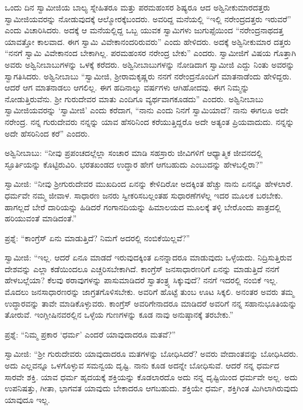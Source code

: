  ಒಂದು ದಿನ ಸ್ವಾಮೀಜಿಯ ಬಾಲ್ಯ ಸ್ನೇಹಿತರೂ ಮತ್ತು ಪರಮಹಂಸರ ಶಿಷ್ಯರೂ ಆದ ಅಶ್ವಿನೀಕುಮಾರದತ್ತರು ಸ್ವಾಮೀಜಿಯವರನ್ನು ನೋಡುವುದಕ್ಕೆ ಆಲ್ಮೋರಕ್ಕೆ\break ಬಂದರು. ಅವರಿದ್ದ ಮನೆಯಲ್ಲಿ “ಇಲ್ಲಿ ನರೇಂದ್ರದತ್ತರು ಇರುವರೆ” ಎಂದು ವಿಚಾರಿಸಿದರು. ಅದಕ್ಕೆ ಆ ಮನೆಯಲ್ಲಿದ್ದ ಒಬ್ಬ ಯುವಕ ಸ್ವಾಮಿಗಳು ಜುಗುಪ್ಸೆಯಿಂದ “ನರೇಂದ್ರನಾಥದತ್ತ ಯಾವತ್ತೋ ಕಾಲವಾದ. ಈಗ ಸ್ವಾಮಿ ವಿವೇಕಾನಂದರಿರುವರು” ಎಂದು ಹೇಳಿದರು. ಅದಕ್ಕೆ ಅಶ್ವಿನೀಕುಮಾರ ದತ್ತರು “ನನಗೆ ಸ್ವಾಮಿ ವಿವೇಕಾನಂದ ಬೇಕಾಗಿಲ್ಲ. ಪರಮಹಂಸರ ನರೇಂದ್ರ ಬೇಕು” ಎಂದರು. ಸ್ವಾಮೀಜಿಗೆ ವಿಷಯ ಗೊತ್ತಾಗಿ ಅವರು ಅಶ್ವಿನೀಬಾಬುಗಳನ್ನು ಒಳಕ್ಕೆ ಕರೆದರು. ಅಶ್ವಿನೀಬಾಬುಗಳನ್ನು ನೋಡಿದಾಗ ಸ್ವಾಮೀಜಿ ಎದ್ದು ನಿಂತು ಅವರನ್ನು ಸ್ವಾಗತಿಸಿದರು. ಅಶ್ವಿನೀಬಾಬು “ಸ್ವಾಮೀಜಿ, ಶ‍್ರೀರಾಮಕೃಷ್ಣರು ನನಗೆ ನರೇಂದ್ರನೊಂದಿಗೆ ಮಾತನಾಡೆಂದು ಹೇಳಿದ್ದರು. ಆದರೆ ಆಗ ಮಾತನಾಡಲು ಆಗಲಿಲ್ಲ. ಈಗ ಹದಿನಾಲ್ಕು ವರ್ಷಗಳು ಆಗಿಹೋದವು. ಈಗ ನಿಮ್ಮನ್ನು ನೋಡುತ್ತಿರುವೆನು. ಶ‍್ರೀ ಗುರುದೇವರ ಮಾತು ಎಂದಿಗೂ ವ್ಯರ್ಥವಾಗಕೂಡದು” ಎಂದರು. ಅಶ್ವಿನೀಬಾಬು ಸ್ವಾಮೀಜಿಯವರನ್ನು ‘ಸ್ವಾಮೀಜಿ’ ಎಂದು ಕರೆದಾಗ, “ನಾನು ಎಂದು ನಿನಗೆ ಸ್ವಾಮಿಯಾದೆ? ನಾನು ಈಗಲೂ ಅದೇ ನರೇಂದ್ರ. ನನ್ನ ಗುರುದೇವರು ನನ್ನನ್ನು ಯಾವ ಹೆಸರಿನಿಂದ ಕರೆಯುತ್ತಿದ್ದರೊ ಅದೇ ಅತ್ಯಂತ ಪ್ರಿಯವಾದುದು. ನನ್ನನ್ನು ಅದೇ ಹೆಸರಿನಿಂದ ಕರೆ” ಎಂದರು. 

 ಅಶ್ವಿನೀಬಾಬು: “ನೀವು ಪ್ರಪಂಚದಲ್ಲೆಲ್ಲಾ ಸಂಚಾರ ಮಾಡಿ ಸಹಸ್ರಾರು ಜೀವಿಗಳಿಗೆ ಆಧ್ಯಾತ್ಮಿಕ ಜೀವನದಲ್ಲಿ ಸ್ಫೂರ್ತಿಯನ್ನು ಕೊಟ್ಟಿರುವಿರಿ. ಭರತಖಂಡದ ಉದ್ಧಾರ ಹೇಗೆ ಆಗಬಹುದು ಎಂಬುದನ್ನು ಹೇಳಬಲ್ಲಿರಾ?” 

 ಸ್ವಾಮೀಜಿ: “ನೀವು ಶ‍್ರೀಗುರುದೇವರ ಮುಖದಿಂದ ಏನನ್ನು ಕೇಳಿದಿರೋ ಅದಕ್ಕಿಂತ ಹೆಚ್ಚು ನಾನು ಏನನ್ನೂ ಹೇಳಲಾರೆ. ಧರ್ಮವೇ ನಮ್ಮ ಜೀವಾಳ. ಸಾಧಾರಣ ಜನರು ಸ್ವೀಕರಿಸಬಲ್ಲಂತಹ ಸುಧಾರಣೆಗಳೆಲ್ಲ ಇದರ ಮೂಲಕ ಬರಬೇಕು. ಹಾಗಲ್ಲದೆ ಬೇರೆ ದಾರಿಯನ್ನು ಹಿಡಿದರೆ ಗಂಗಾನದಿಯನ್ನು ಹಿಮಾಲಯದ ಮೂಲಕ್ಕೆ ತಳ್ಳಿ ಬೇರೊಂದು ಪಾತ್ರದಲ್ಲಿ ಹರಿಯುವಂತೆ ಮಾಡಿದಂತೆ.” 

 ಪ್ರಶ್ನೆ: “ಕಾಂಗ್ರೆಸ್ ಏನು ಮಾಡುತ್ತಿದೆ? ನಿಮಗೆ ಅದರಲ್ಲಿ ನಂಬಿಕೆಯಿಲ್ಲವೆ?” 

 ಸ್ವಾಮೀಜಿ: “ಇಲ್ಲ. ಆದರೆ ಏನೂ ಮಾಡದೆ ಇರುವುದಕ್ಕಿಂತ ಏನನ್ನಾದರೂ‌ ಮಾಡುವುದು ಒಳ್ಳೆಯದು. ನಿದ್ರಿಸುತ್ತಿರುವ ದೇಶವನ್ನು ಎಲ್ಲಾ ಕಡೆಯಿಂದಲೂ ಎಚ್ಚರಿಸಬೇಕಾಗಿದೆ. ಕಾಂಗ್ರೆಸ್ ಜನಸಾಧಾರಣರಿಗೆ ಏನನ್ನು ಮಾಡುತ್ತಿದೆ ನನಗೆ ಹೇಳಬಲ್ಲೆಯಾ? ಕೆಲವು ಠರಾವುಗಳನ್ನು ಪಾಸುಮಾಡಿದರೆ ಸ್ವಾತಂತ್ರ್ಯ ಸಿಕ್ಕುವುದೆ? ನನಗೆ ಇದರಲ್ಲಿ ನಂಬಿಕೆ ಇಲ್ಲ. ಮೊದಲು ಜನಸಾಧಾರಣರನ್ನು ಜಾಗ್ರತಗೊಳಿಸಬೇಕು. ಅವರಿಗೆ ಹೊಟ್ಟೆ ತುಂಬ ಊಟ ಸಿಕ್ಕಲಿ. ಅನಂತರ ಅವರು ತಮ್ಮ ಉದ್ಧಾರವನ್ನು ತಾವೇ ಮಾಡಿಕೊಳ್ಳುವರು. ಕಾಂಗ್ರೆಸ್ ಅವರಿಗೇನಾದರೂ ಮಾಡಿದರೆ ಅವರಿಗೆ ನನ್ನ ಸಹಾನುಭೂತಿಯನ್ನು ತೋರುವೆ. ಇಂಗ್ಲೀಷಿನವರಲ್ಲಿನ ಒಳ್ಳೆಯ ಗುಣಗಳನ್ನು ಕೂಡ ನಾವು ಅನುಷ್ಠಾನಕ್ಕೆ ತರಬೇಕು.” 

 ಪ್ರಶ್ನೆ: “ನಿಮ್ಮ ಪ್ರಕಾರ ‘ಧರ್ಮ’ ಎಂದರೆ ಯಾವುದಾದರೂ ಮತವೆ?” 

 ಸ್ವಾಮೀಜಿ: “ಶ‍್ರೀ ಗುರುದೇವರು ಯಾವುದಾದರೂ ಮತಗಳನ್ನು ಬೋಧಿಸಿದರೆ? ಅವರು ವೇದಾಂತವನ್ನು ಬೋಧಿಸಿದರು. ಅದು ಎಲ್ಲವನ್ನೂ ಒಳಗೊಳ್ಳುವ ಸಮನ್ವಯ ದೃಷ್ಟಿ. ನಾನು ಕೂಡ ಅದನ್ನೇ ಬೋಧಿಸುವೆ. ಆದರೆ ನನ್ನ ಧರ್ಮದ ಸಾರವೇ ಶಕ್ತಿ. ಯಾವ ಧರ್ಮ ಹೃದಯಕ್ಕೆ ಶಕ್ತಿಯನ್ನು ಕೊಡಲಾರದೊ ಅದು ನನ್ನ ದೃಷ್ಟಿಯಿಂದ ಧರ್ಮವೇ ಅಲ್ಲ. ಅದು ಉಪನಿಷತ್ತು, ಗೀತಾ, ಭಾಗವತ ಯಾವುದು ಬೇಕಾದರೂ ಆಗಬಹುದು. ಶಕ್ತಿಯೇ ಧರ್ಮ, ಶಕ್ತಿಗಿಂತ ಮಿಗಿಲಾಗಿರುವುದು ಯಾವುದೂ ಇಲ್ಲ. 

